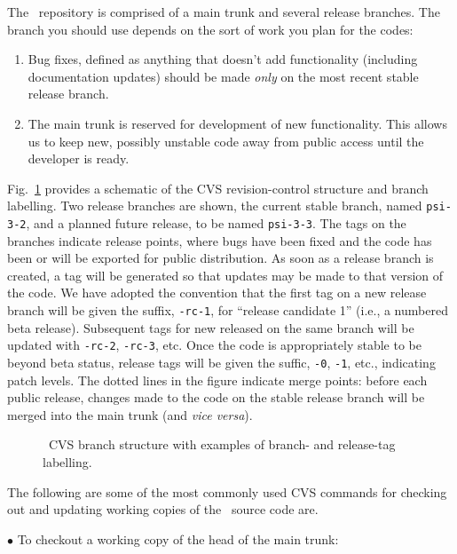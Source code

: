 The \PSIthree\ repository is comprised of a main trunk and several
release branches.  The branch you should use depends on the sort of 
work you plan for the codes:
\begin{enumerate}
\item Bug fixes, defined as anything that doesn't add functionality
(including documentation updates) should be made {\em only} on the most
recent stable release branch.
\item The main trunk is reserved for development of new functionality.
This allows us to keep new, possibly unstable code away from public
access until the developer is ready.
\end{enumerate}

\noindent Fig.~\ref{Fig:cvs} provides a schematic of the CVS revision-control
structure and branch labelling.  Two release branches are shown, the current
stable branch, named {\tt psi-3-2}, and a planned future release, to be
named {\tt psi-3-3}.  The tags on the branches indicate release points,
where bugs have been fixed and the code has been or will be exported for
public distribution.  As soon as a release branch is created, a tag will
be generated so that updates may be made to that version of the code.
We have adopted the convention that the first tag on a new release branch
will be given the suffix, {\tt -rc-1}, for ``release candidate 1'' (i.e.,
a numbered beta release).  Subsequent tags for new released on the same
branch will be updated with {\tt -rc-2}, {\tt -rc-3}, etc.  Once the
code is appropriately stable to be beyond beta status, release tags will
be given the suffic, {\tt -0}, {\tt -1}, etc., indicating patch levels.
The dotted lines in the figure indicate merge points: before each public
release, changes made to the code on the stable release branch will be
merged into the main trunk (and {\em vice versa}).

\begin{figure}[h]
\begin{center}
\end{center}
\caption{\PSIthree\ CVS branch structure with examples of branch- and
release-tag labelling.}
\label{Fig:cvs}
\end{figure}

\noindent
The following are some of the most commonly used CVS commands for checking
out and updating working copies of the \PSIthree\ source code are.

\noindent
$\bullet$ To checkout a working copy of the head of the main trunk:

